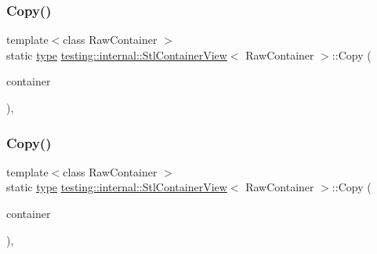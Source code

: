 \mbox{\label{classtesting_1_1internal_1_1_stl_container_view_a441123838221f1284873f66ed968f279}} 
\subsubsection{\texorpdfstring{Copy()}{Copy()}\hspace{0.1cm}{\footnotesize\ttfamily [1/3]}}
{\footnotesize\ttfamily template$<$class Raw\+Container $>$ \\
static \mbox{\hyperlink{classtesting_1_1internal_1_1_stl_container_view_a2b2c63a6dcdbfe63fb0ee121ebf463ba}{type}} \mbox{\hyperlink{classtesting_1_1internal_1_1_stl_container_view}{testing\+::internal\+::\+Stl\+Container\+View}}$<$ Raw\+Container $>$\+::Copy (\begin{DoxyParamCaption}\item[{const Raw\+Container \&}]{container }\end{DoxyParamCaption})\hspace{0.3cm}{\ttfamily [inline]}, {\ttfamily [static]}}

\mbox{\label{classtesting_1_1internal_1_1_stl_container_view_a441123838221f1284873f66ed968f279}} 
\subsubsection{\texorpdfstring{Copy()}{Copy()}\hspace{0.1cm}{\footnotesize\ttfamily [2/3]}}
{\footnotesize\ttfamily template$<$class Raw\+Container $>$ \\
static \mbox{\hyperlink{classtesting_1_1internal_1_1_stl_container_view_a2b2c63a6dcdbfe63fb0ee121ebf463ba}{type}} \mbox{\hyperlink{classtesting_1_1internal_1_1_stl_container_view}{testing\+::internal\+::\+Stl\+Container\+View}}$<$ Raw\+Container $>$\+::Copy (\begin{DoxyParamCaption}\item[{const Raw\+Container \&}]{container }\end{DoxyParamCaption})\hspace{0.3cm}{\ttfamily [inline]}, {\ttfamily [static]}}

